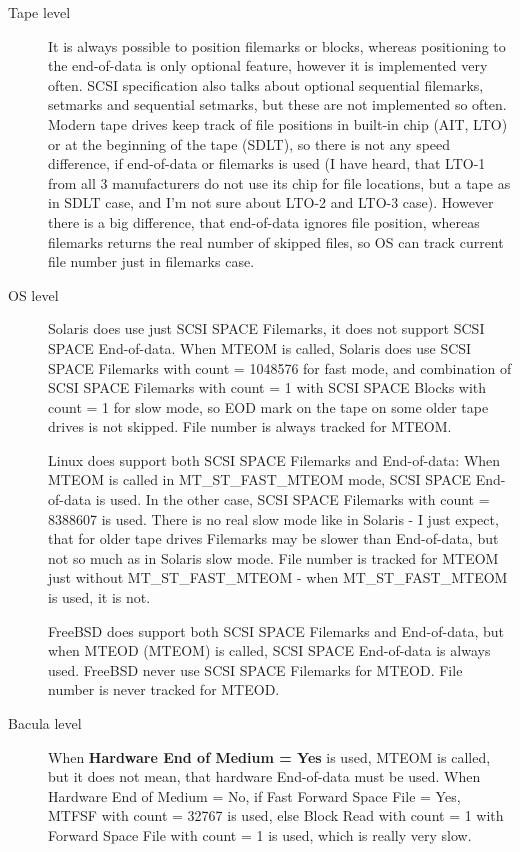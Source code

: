 \begin{description}
\item[Tape level]
  It is always possible to position filemarks or blocks, whereas
  positioning to the end-of-data is only optional feature, however it is
  implemented very often.  SCSI specification also talks about optional
  sequential filemarks, setmarks and sequential setmarks, but these are not
  implemented so often.  Modern tape drives keep track of file positions in
  built-in chip (AIT, LTO) or at the beginning of the tape (SDLT), so there
  is not any speed difference, if end-of-data or filemarks is used (I have
  heard, that LTO-1 from all 3 manufacturers do not use its chip for file
  locations, but a tape as in SDLT case, and I'm not sure about LTO-2 and
  LTO-3 case).  However there is a big difference, that end-of-data ignores
  file position, whereas filemarks returns the real number of skipped
  files, so OS can track current file number just in filemarks case.

\item[OS level]
  Solaris does use just SCSI SPACE Filemarks, it does not support SCSI
  SPACE End-of-data.  When MTEOM is called, Solaris does use SCSI SPACE
  Filemarks with count = 1048576 for fast mode, and combination of SCSI
  SPACE Filemarks with count = 1 with SCSI SPACE Blocks with count = 1 for
  slow mode, so EOD mark on the tape on some older tape drives is not
  skipped.  File number is always tracked for MTEOM.

  Linux does support both SCSI SPACE Filemarks and End-of-data: When MTEOM
  is called in MT\_ST\_FAST\_MTEOM mode, SCSI SPACE End-of-data is used.
  In the other case, SCSI SPACE Filemarks with count =
  8388607 is used.  
  There is no real slow mode like in Solaris - I just expect, that for
  older tape drives Filemarks may be slower than End-of-data, but not so
  much as in Solaris slow mode.  File number is tracked for MTEOM just
  without MT\_ST\_FAST\_MTEOM - when MT\_ST\_FAST\_MTEOM is used, it is not.

  FreeBSD does support both SCSI SPACE Filemarks and End-of-data, but when
  MTEOD (MTEOM) is called, SCSI SPACE End-of-data is always used.  FreeBSD
  never use SCSI SPACE Filemarks for MTEOD. File number is never tracked
  for MTEOD.

\item[Bacula level]
  When {\bf Hardware End of Medium = Yes} is used, MTEOM is called, but it
  does not mean, that hardware End-of-data must be used.  When Hardware End
  of Medium = No, if Fast Forward Space File = Yes, MTFSF with count =
  32767 is used, else Block Read with count = 1 with Forward Space File
  with count = 1 is used, which is really very slow.


\end{description}
